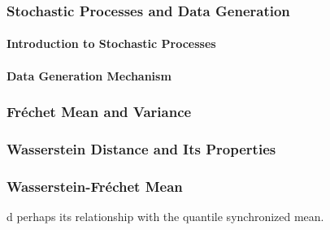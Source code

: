 \subsubsection{Stochastic Processes and Data Generation}
\label{sec:stochastic_processes}
\paragraph{Introduction to Stochastic Processes}
\label{sec:intro_stochastic}
\paragraph{Data Generation Mechanism}
\label{sec:data_generation}

\subsubsection{Fréchet Mean and Variance}
\label{sec:f_mean}

\subsubsection{Wasserstein Distance and Its Properties}
\label{sec:wasserstein_distance}

\subsubsection{Wasserstein-Fréchet Mean}
\label{sec:wasserstein_f_mean}
d perhaps its relationship with the quantile synchronized mean.
